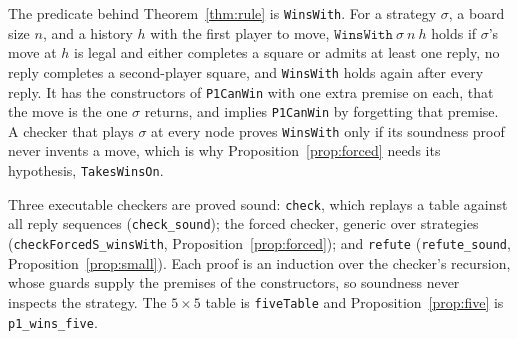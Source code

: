\documentclass[11pt]{amsart}
\theoremstyle{definition}
\theoremstyle{remark}
\begin{document}
The predicate behind Theorem~\ref{thm:rule} is \texttt{WinsWith}. For a
strategy $\sigma$, a board size $n$, and a history $h$ with the first
player to move, $\texttt{WinsWith}\ \sigma\ n\ h$ holds if $\sigma$'s
move at $h$ is legal and either completes a square or admits at least
one reply, no reply completes a second-player square, and
\texttt{WinsWith} holds again after every reply. It has the
constructors of
\texttt{P1CanWin} with one extra premise on each, that the move is the
one $\sigma$ returns, and implies \texttt{P1CanWin} by forgetting that
premise. A checker that plays $\sigma$ at every node proves
\texttt{WinsWith} only if its soundness proof never invents a move,
which is why Proposition~\ref{prop:forced} needs its hypothesis,
\texttt{TakesWinsOn}.

Three executable checkers are proved sound: \texttt{check}, which
replays a table against all reply sequences (\texttt{check\_sound});
the forced checker, generic over strategies
(\texttt{checkForcedS\_winsWith}, Proposition~\ref{prop:forced}); and
\texttt{refute} (\texttt{refute\_sound}, Proposition~\ref{prop:small}).
Each proof is an induction over the checker's recursion, whose guards
supply the premises of the constructors, so soundness never inspects
the strategy. The $5 \times 5$ table is
\texttt{fiveTable} and Proposition~\ref{prop:five} is
\texttt{p1\_wins\_five}.
\end{document}
